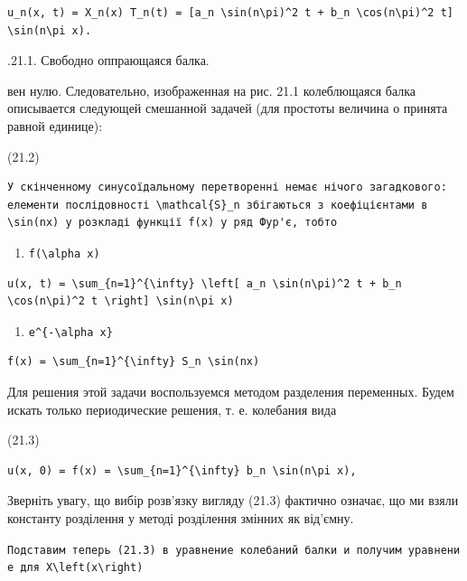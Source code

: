 \documentclass[
  ukrainian,
]{article}
\providecommand{\tightlist}{%
  \setlength{\itemsep}{0pt}\setlength{\parskip}{0pt}}
\begin{document}
\begin{verbatim}
u_n(x, t) = X_n(x) T_n(t) = [a_n \sin(n\pi)^2 t + b_n \cos(n\pi)^2 t] \sin(n\pi x).
\end{verbatim}

.21.1. Свободно оппрающаяся балка.

вен нулю. Следовательно, изображенная на рис. 21.1 колеблющаяся балка
описывается следующей смешанной задачей (для простоты величина о принята
равной единице):

(21.2)

\begin{verbatim}
У скінченному синусоїдальному перетворенні немає нічого загадкового: елементи послідовності \mathcal{S}_n збігаються з коефіцієнтами в \sin(nx) у розкладі функції f(x) у ряд Фур'є, тобто
\end{verbatim}

\begin{enumerate}
\def\labelenumi{\arabic{enumi}.}
\setcounter{enumi}{1}
\tightlist
\item
  \texttt{f(\textbackslash{}alpha\ x)}
\end{enumerate}

\begin{verbatim}
u(x, t) = \sum_{n=1}^{\infty} \left[ a_n \sin(n\pi)^2 t + b_n \cos(n\pi)^2 t \right] \sin(n\pi x)
\end{verbatim}

\begin{enumerate}
\def\labelenumi{\arabic{enumi}.}
\setcounter{enumi}{2}
\tightlist
\item
  \texttt{e\^{}\{-\textbackslash{}alpha\ x\}}
\end{enumerate}

\begin{verbatim}
f(x) = \sum_{n=1}^{\infty} S_n \sin(nx)
\end{verbatim}

Для решения этой задачи воспользуемся методом разделения переменных.
Будем искать только периодические решения, т. е. колебания вида

(21.3)

\begin{verbatim}
u(x, 0) = f(x) = \sum_{n=1}^{\infty} b_n \sin(n\pi x),
\end{verbatim}

Зверніть увагу, що вибір розв'язку вигляду (21.3) фактично означає, що
ми взяли константу розділення у методі розділення змінних як від'ємну.

\texttt{Подставим\ теперь\ (21.3)\ в\ уравнение\ колебаний\ балки\ и\ получим\ уравнение\ для\ \textquotesingle{}X\textbackslash{}left(x\textbackslash{}right)\textquotesingle{}}
\end{document}
